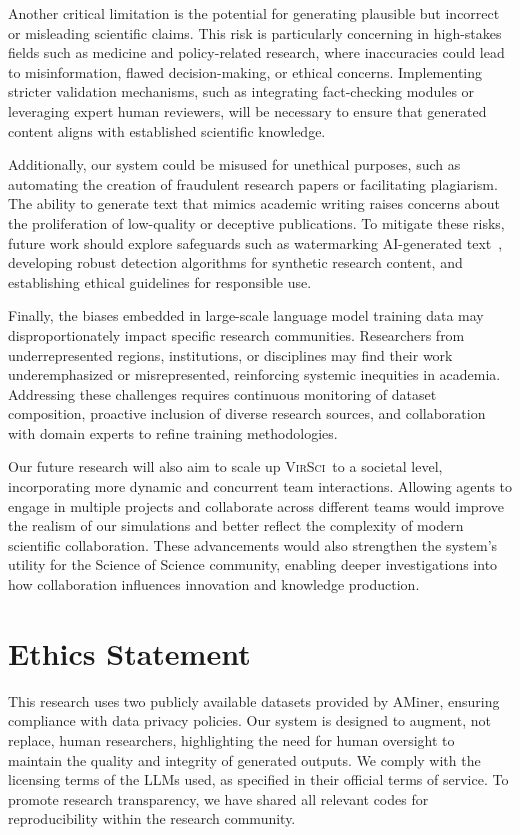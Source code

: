 \documentclass[11pt]{article}
\def\modelname{\textsc{VirSci\xspace}}
\begin{document}
Another critical limitation is the potential for generating plausible but incorrect or misleading scientific claims. This risk is particularly concerning in high-stakes fields such as medicine and policy-related research, where inaccuracies could lead to misinformation, flawed decision-making, or ethical concerns. Implementing stricter validation mechanisms, such as integrating fact-checking modules or leveraging expert human reviewers, will be necessary to ensure that generated content aligns with established scientific knowledge.

Additionally, our system could be misused for unethical purposes, such as automating the creation of fraudulent research papers or facilitating plagiarism. The ability to generate text that mimics academic writing raises concerns about the proliferation of low-quality or deceptive publications. To mitigate these risks, future work should explore safeguards such as watermarking AI-generated text~\cite{zhao2023provable}, developing robust detection algorithms for synthetic research content, and establishing ethical guidelines for responsible use.

Finally, the biases embedded in large-scale language model training data may disproportionately impact specific research communities. Researchers from underrepresented regions, institutions, or disciplines may find their work underemphasized or misrepresented, reinforcing systemic inequities in academia. Addressing these challenges requires continuous monitoring of dataset composition, proactive inclusion of diverse research sources, and collaboration with domain experts to refine training methodologies.

Our future research will also aim to scale up \modelname\ to a societal level, incorporating more dynamic and concurrent team interactions. Allowing agents to engage in multiple projects and collaborate across different teams would improve the realism of our simulations and better reflect the complexity of modern scientific collaboration. These advancements would also strengthen the system’s utility for the Science of Science community, enabling deeper investigations into how collaboration influences innovation and knowledge production.

\section{Ethics Statement}\label{ethics}
This research uses two publicly available datasets provided by AMiner, ensuring compliance with data privacy policies. Our system is designed to augment, not replace, human researchers, highlighting the need for human oversight to maintain the quality and integrity of generated outputs. 
We comply with the licensing terms of the LLMs used, as specified in their official terms of service. 
To promote research transparency, we have shared all relevant codes for reproducibility within the research community.
\end{document}
